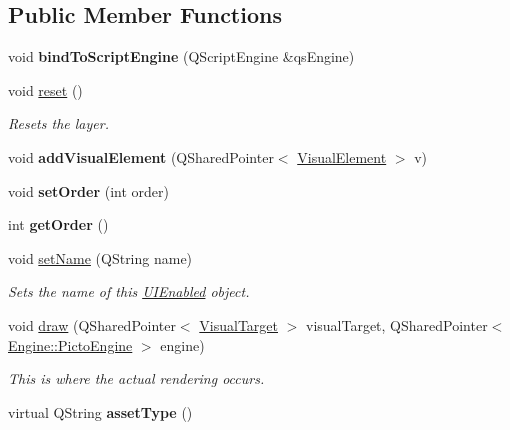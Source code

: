 \subsection*{Public Member Functions}
\begin{DoxyCompactItemize}
\item 
\hypertarget{class_picto_1_1_layer_a5b22d7f4cf67df2a349af5194f4aff98}{void {\bfseries bind\-To\-Script\-Engine} (Q\-Script\-Engine \&qs\-Engine)}\label{class_picto_1_1_layer_a5b22d7f4cf67df2a349af5194f4aff98}

\item 
\hypertarget{class_picto_1_1_layer_ae29e8fbd41d460e1f2e9c4eaa47f98a1}{void \hyperlink{class_picto_1_1_layer_ae29e8fbd41d460e1f2e9c4eaa47f98a1}{reset} ()}\label{class_picto_1_1_layer_ae29e8fbd41d460e1f2e9c4eaa47f98a1}

\begin{DoxyCompactList}\small\item\em Resets the layer. \end{DoxyCompactList}\item 
\hypertarget{class_picto_1_1_layer_ae1710bf1c95d2aa44e872e1acceaa406}{void {\bfseries add\-Visual\-Element} (Q\-Shared\-Pointer$<$ \hyperlink{struct_picto_1_1_visual_element}{Visual\-Element} $>$ v)}\label{class_picto_1_1_layer_ae1710bf1c95d2aa44e872e1acceaa406}

\item 
\hypertarget{class_picto_1_1_layer_a73d801eb580171894f59e8b7294b9c4d}{void {\bfseries set\-Order} (int order)}\label{class_picto_1_1_layer_a73d801eb580171894f59e8b7294b9c4d}

\item 
\hypertarget{class_picto_1_1_layer_aacbf64587c783224588fbfb98273e424}{int {\bfseries get\-Order} ()}\label{class_picto_1_1_layer_aacbf64587c783224588fbfb98273e424}

\item 
\hypertarget{class_picto_1_1_layer_a7812cee284f33e4e0453e8410861bf27}{void \hyperlink{class_picto_1_1_layer_a7812cee284f33e4e0453e8410861bf27}{set\-Name} (Q\-String name)}\label{class_picto_1_1_layer_a7812cee284f33e4e0453e8410861bf27}

\begin{DoxyCompactList}\small\item\em Sets the name of this \hyperlink{class_picto_1_1_u_i_enabled}{U\-I\-Enabled} object. \end{DoxyCompactList}\item 
void \hyperlink{class_picto_1_1_layer_a821926ea7125068c43ebdddefba2d2c4}{draw} (Q\-Shared\-Pointer$<$ \hyperlink{class_picto_1_1_visual_target}{Visual\-Target} $>$ visual\-Target, Q\-Shared\-Pointer$<$ \hyperlink{class_picto_1_1_engine_1_1_picto_engine}{Engine\-::\-Picto\-Engine} $>$ engine)
\begin{DoxyCompactList}\small\item\em This is where the actual rendering occurs. \end{DoxyCompactList}\item 
\hypertarget{class_picto_1_1_layer_a0905092040fbf2184717c7329b5ce8f5}{virtual Q\-String {\bfseries asset\-Type} ()}\label{class_picto_1_1_layer_a0905092040fbf2184717c7329b5ce8f5}


\end{DoxyCompactItemize}

